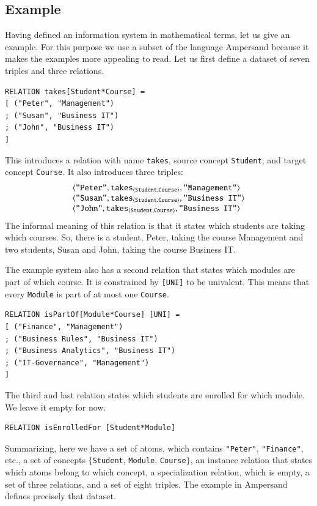 \documentclass{elsarticle}
\begin{document}
\subsection{Example}
\label{old IS}
   Having defined an information system in mathematical terms, let us give an example.
   For this purpose we use a subset of the language Ampersand
   because it makes the examples more appealing to read.
   Let us first define a dataset of seven triples and three relations.
\begin{verbatim}
RELATION takes[Student*Course] =
[ ("Peter", "Management")
; ("Susan", "Business IT")
; ("John", "Business IT")
]
\end{verbatim}
   This introduces a relation with name \verb#takes#,
   source concept \verb#Student#, and
   target concept \verb#Course#.
   It also introduces three triples:
\[\begin{array}{l}
   \langle{\text{\tt "Peter"}},{\text{\it \text{\tt takes}\/}_{\langle{\text{\tt Student}},{\text{\tt Course}}\rangle}},{\text{\tt "Management"}}\rangle\\
   \langle{\text{\tt "Susan"}},{\text{\it \text{\tt takes}\/}_{\langle{\text{\tt Student}},{\text{\tt Course}}\rangle}},{\text{\tt "Business IT"}}\rangle\\
   \langle{\text{\tt "John"}},{\text{\it \text{\tt takes}\/}_{\langle{\text{\tt Student}},{\text{\tt Course}}\rangle}},{\text{\tt "Business IT"}}\rangle\\
\end{array}\]
   The informal meaning of this relation is that it states which students are taking which courses.
   So, there is a student, Peter, taking the course Management and two students, Susan and John, taking the course Business IT.

   The example system also has a second relation that states which modules are part of which course.
   It is constrained by \verb-[UNI]- to be univalent.
   This means that every \verb-Module- is part of at most one \verb-Course-.
\begin{verbatim}
RELATION isPartOf[Module*Course] [UNI] =
[ ("Finance", "Management")
; ("Business Rules", "Business IT")
; ("Business Analytics", "Business IT")
; ("IT-Governance", "Management")
]
\end{verbatim}
   The third and last relation states which students are enrolled for which module.
   We leave it empty for now.
\begin{verbatim}
RELATION isEnrolledFor [Student*Module]
\end{verbatim}
   Summarizing, here we have a set of atoms, which contains \verb-"Peter"-, \verb-"Finance"-, etc.,
   a set of concepts $\{$\verb-Student-, \verb-Module-, \verb-Course-$\}$,
   an instance relation that states which atoms belong to which concept,
   a specialization relation, which is empty,
   a set of three relations, and
   a set of eight triples.
   The example in Ampersand defines precisely that dataset.
   
\end{document}
